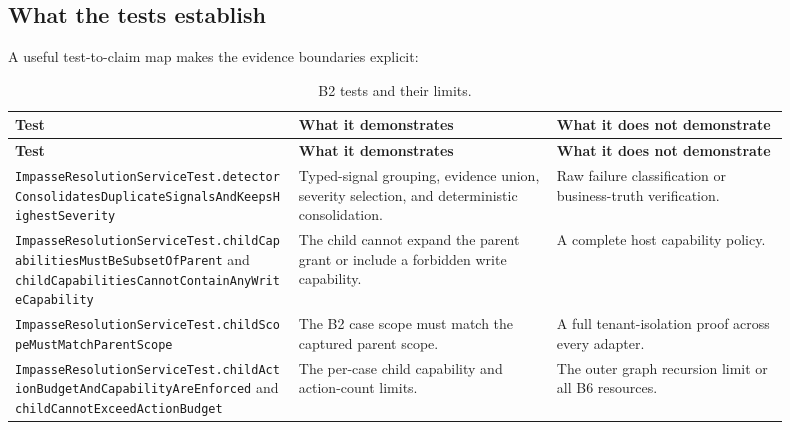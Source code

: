 \subsection{What the tests establish}
\label{subsec:ch22-test-map}

A useful test-to-claim map makes the evidence boundaries explicit:

\small\begin{longtable}{>{\raggedright\arraybackslash}p{0.33\linewidth} >{\raggedright\arraybackslash}p{0.30\linewidth} >{\raggedright\arraybackslash}p{0.27\linewidth}}
\caption{B2 tests and their limits.}\label{tab:ch22-test-map}\\
\toprule
\textbf{Test} & \textbf{What it demonstrates} & \textbf{What it does not demonstrate} \\
\midrule
\endfirsthead
\toprule
\textbf{Test} & \textbf{What it demonstrates} & \textbf{What it does not demonstrate} \\
\midrule
\endhead
\texttt{Impasse\allowbreak Resolution\allowbreak Service\allowbreak Test.\allowbreak detector\allowbreak Consolidates\allowbreak Duplicate\allowbreak Signals\allowbreak And\allowbreak Keeps\allowbreak Highest\allowbreak Severity} & Typed-signal grouping, evidence union, severity selection, and deterministic consolidation. & Raw failure classification or business-truth verification. \\
\texttt{Impasse\allowbreak Resolution\allowbreak Service\allowbreak Test.\allowbreak child\allowbreak Capabilities\allowbreak Must\allowbreak Be\allowbreak Subset\allowbreak Of\allowbreak Parent} and \texttt{child\allowbreak Capabilities\allowbreak Cannot\allowbreak Contain\allowbreak Any\allowbreak Write\allowbreak Capability} & The child cannot expand the parent grant or include a forbidden write capability. & A complete host capability policy. \\
\texttt{Impasse\allowbreak Resolution\allowbreak Service\allowbreak Test.\allowbreak child\allowbreak Scope\allowbreak Must\allowbreak Match\allowbreak Parent\allowbreak Scope} & The B2 case scope must match the captured parent scope. & A full tenant-isolation proof across every adapter. \\
\texttt{Impasse\allowbreak Resolution\allowbreak Service\allowbreak Test.\allowbreak child\allowbreak Action\allowbreak Budget\allowbreak And\allowbreak Capability\allowbreak Are\allowbreak Enforced} and \texttt{child\allowbreak Cannot\allowbreak Exceed\allowbreak Action\allowbreak Budget} & The per-case child capability and action-count limits. & The outer graph recursion limit or all B6 resources. \\

\end{longtable}
